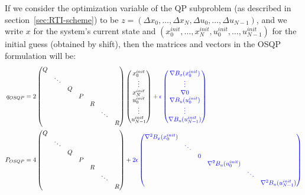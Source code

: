 \documentclass[12pt]{article}
\begin{document}
If we consider the optimization variable of the QP subproblem (as described in section~\ref{sec:RTI-scheme}) to be $z=(\Delta x_0,\ldots,\Delta x_N,\Delta u_0, \ldots,\Delta u_{N-1})$, and we write $x$ for the system's current state and  $(x_0^{init},\ldots,x_{N}^{init},u_0^{init},\ldots,u_{N-1}^{init})$ for the initial guess (obtained by shift), then the matrices and vectors in the OSQP formulation will be:
\scriptsize
\begin{align*}
	q_{OSQP}&=2\begin{pmatrix}
		Q&&&&&&\\
		&\ddots&&&&&\\
		&&Q&&&&\\
		&&&P&&&\\
		&&&&R&&\\
		&&&&&\ddots&\\
		&&&&&&R
	\end{pmatrix}\begin{pmatrix}
		x_0^{init}\\\vdots\\x_N^{init}\\u_0^{init}\\\vdots\\u_{N-1}^{init}
	\end{pmatrix}+\color{blue}\epsilon\begin{pmatrix}
		\nabla B_x(x_0^{init})\\\vdots\\\nabla 0\\\nabla B_u(u_0^{init})\\\vdots\\\nabla B_u(u_{N-1}^{init})
	\end{pmatrix}\color{black}\\
	P_{OSQP}&=4\begin{pmatrix}
		Q&&&&&&\\
		&\ddots&&&&&\\
		&&Q&&&&\\
		&&&P&&&\\
		&&&&R&&\\
		&&&&&\ddots&\\
		&&&&&&R
	\end{pmatrix}+\color{blue}2\epsilon\begin{pmatrix}
		\nabla^2B_x(x_0^{init})&&&&&\\
		&\ddots&&&&\\
		&&0&&&\\
		&&&\nabla^2B_u(u_0^{init})&&\\
		&&&&\ddots&\\
		&&&&&\nabla^2B_u(u_{N-1}^{init})
	\end{pmatrix}\color{black}
\end{align*}
\end{document}
